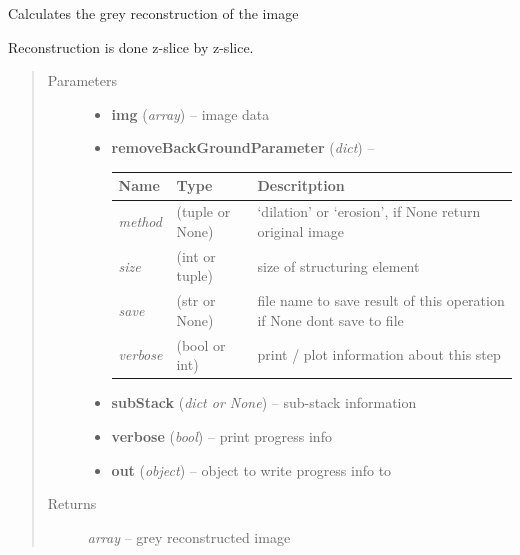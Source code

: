\documentclass[letterpaper,10pt,english]{sphinxmanual}
\begin{document}

\begin{fulllineitems}
\label{api/ClearMap.ImageProcessing:ClearMap.ImageProcessing.GreyReconstruction.greyReconstruction}
Calculates the grey reconstruction of the image

Reconstruction is done z-slice by z-slice.
\begin{quote}\begin{description}
\item[{Parameters}] \leavevmode\begin{itemize}
\item {} 
\textbf{img} (\emph{array}) --
image data

\item {} 
\textbf{removeBackGroundParameter} (\emph{dict}) --

\begin{tabulary}{\linewidth}{|L|L|L|}
\hline
\textsf{\relax 
Name
} & \textsf{\relax 
Type
} & \textsf{\relax 
Descritption
}\\
\hline
\emph{method}
 & 
(tuple or None)
 & 
`dilation' or `erosion', if None return original image
\\
\hline
\emph{size}
 & 
(int or tuple)
 & 
size of structuring element
\\
\hline
\emph{save}
 & 
(str or None)
 & 
file name to save result of this operation
if None dont save to file
\\
\hline
\emph{verbose}
 & 
(bool or int)
 & 
print / plot information about this step
\\
\hline\end{tabulary}


\item {} 
\textbf{subStack} (\emph{dict or None}) --
sub-stack information

\item {} 
\textbf{verbose} (\emph{bool}) --
print progress info

\item {} 
\textbf{out} (\emph{object}) --
object to write progress info to

\end{itemize}

\item[{Returns}] \leavevmode
\emph{array} --
grey reconstructed image

\end{description}\end{quote}

\end{fulllineitems}
\end{document}
